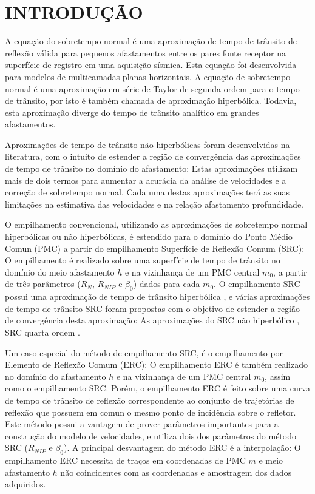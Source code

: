 \chapter{INTRODUÇÃO}
\label{intro}

A equação do sobretempo normal \cite{dix} é uma aproximação de tempo de trânsito de reflexão válida para pequenos afastamentos
entre os pares fonte receptor na superfície de registro em uma aquisição sísmica. Esta equação foi desenvolvida para modelos de
multicamadas planas horizontais. 
A equação de sobretempo normal é uma aproximação em série de Taylor de segunda ordem para o tempo de trânsito, por isto é
também chamada de aproximação hiperbólica. Todavia, esta aproximação diverge do tempo de trânsito analítico
em grandes afastamentos.

Aproximações de tempo de trânsito não hiperbólicas foram desenvolvidas na literatura,
com o intuito de estender a região de convergência das
aproximações de tempo de trânsito no domínio do afastamento: Estas aproximações utilizam mais de dois termos para aumentar a 
acurácia da análise de velocidades e a correção de sobretempo normal. Cada uma destas aproximações terá
as suas limitações na estimativa das velocidades e na relação afastamento profundidade.

O empilhamento convencional, utilizando as aproximações de sobretempo normal hiperbólicas ou não hiperbólicas, é estendido
para o domínio do Ponto Médio Comun (PMC) a partir do empilhamento Superfície de Reflexão Comum (SRC): 
O empilhamento é realizado sobre uma superfície de tempo de
trânsito no domínio do meio afastamento $h$ e na vizinhança de um PMC central $m_0$, a partir de
três parâmetros ($R_N$, $R_{NIP}$ e $\beta_0$) dados para cada $m_0$.
O empilhamento SRC possui uma aproximação de tempo de trânsito hiperbólica \cite{jager}, e várias aproximações
de tempo de trânsito SRC foram propostas com o objetivo de estender a região de convergência desta aproximação:
As aproximações do SRC não hiperbólico \cite{fomel1}, SRC quarta ordem
\cite{germam}.

Um caso especial do método de empilhamento SRC, é o empilhamento por Elemento de Reflexão Comum (ERC):
O empilhamento ERC é também realizado no domínio do afastamento $h$ e na vizinhança de um PMC central $m_0$, assim como o
empilhamento SRC. Porém, o empilhamento ERC é feito sobre uma curva de tempo de trânsito de reflexão correspondente ao
conjunto de trajetórias de reflexão que possuem em comun
o mesmo ponto de incidência sobre o refletor.
Este método possui a vantagem de prover
parâmetros importantes para a construção do modelo de velocidades, e utiliza dois dos parâmetros
do método SRC ($R_{NIP}$ e $\beta_0$).
A principal desvantagem do método ERC é a interpolação: O empilhamento ERC necessita de 
traços em coordenadas de PMC $m$ e meio afastamento $h$ não coincidentes com as coordenadas
e amostragem dos dados adquiridos.

